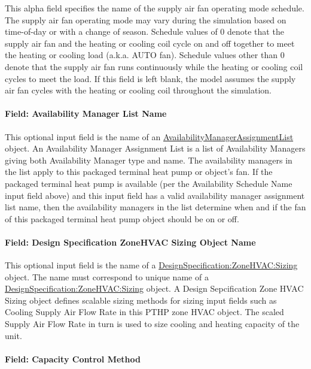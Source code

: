 This alpha field specifies the name of the supply air fan operating mode schedule. The supply air fan operating mode may vary during the simulation based on time-of-day or with a change of season. Schedule values of 0 denote that the supply air fan and the heating or cooling coil cycle on and off together to meet the heating or cooling load (a.k.a. AUTO fan). Schedule values other than 0 denote that the supply air fan runs continuously while the heating or cooling coil cycles to meet the load. If this field is left blank, the model assumes the supply air fan cycles with the heating or cooling coil throughout the simulation.

\paragraph{Field: Availability Manager List Name}\label{field-availability-manager-list-name-7}

This optional input field is the name of an \hyperref[availabilitymanagerassignmentlist]{AvailabilityManagerAssignmentList} object. An Availability Manager Assignment List is a list of Availability Managers giving both Availability Manager type and name. The availability managers in the list apply to this packaged terminal heat pump or object's fan. If the packaged terminal heat pump is available (per the Availability Schedule Name input field above) and this input field has a valid availability manager assignment list name, then the availability managers in the list determine when and if the fan of this packaged terminal heat pump object should be on or off.

\paragraph{Field: Design Specification ZoneHVAC Sizing Object Name}\label{field-design-specification-zonehvac-sizing-object-name-7}

This optional input field is the name of a \hyperref[designspecificationzonehvacsizing]{DesignSpecification:ZoneHVAC:Sizing} object. The name must correspond to unique name of a \hyperref[designspecificationzonehvacsizing]{DesignSpecification:ZoneHVAC:Sizing} object. A Design Sepcification Zone HVAC Sizing object defines scalable sizing methods for sizing input fields such as Cooling Supply Air Flow Rate in this PTHP zone HVAC object. The scaled Supply Air Flow Rate in turn is used to size cooling and heating capacity of the unit.

\paragraph{Field: Capacity Control Method}\label{field-capacity-control-method-3}

